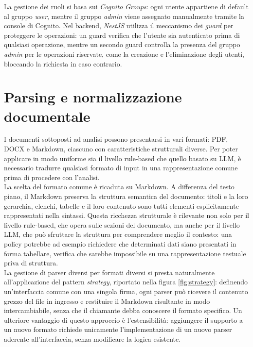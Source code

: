 La gestione dei ruoli si basa sui \emph{Cognito Groups}: ogni utente appartiene di default al gruppo \emph{user}, mentre il gruppo \emph{admin} viene assegnato manualmente tramite la console di Cognito. Nel backend, \emph{NestJS} utilizza il meccanismo dei \emph{guard} per proteggere le operazioni: un guard verifica che l'utente sia autenticato prima di qualsiasi operazione, mentre un secondo guard controlla la presenza del gruppo \emph{admin} per le operazioni riservate, come la creazione e l'eliminazione degli utenti, bloccando la richiesta in caso contrario.

\section{Parsing e normalizzazione documentale}
\label{section:parsing}
I documenti sottoposti ad analisi possono presentarsi in vari formati: PDF, DOCX e Markdown, ciascuno con caratteristiche strutturali diverse. Per poter applicare in modo uniforme sia il livello rule-based che quello basato su LLM, è necessario tradurre qualsiasi formato di input in una rappresentazione comune prima di procedere con l'analisi.\\

La scelta del formato comune è ricaduta su Markdown. A differenza del testo piano, il Markdown preserva la struttura semantica del documento: titoli e la loro gerarchia, elenchi, tabelle e il loro contenuto sono tutti elementi esplicitamente rappresentati nella sintassi. Questa ricchezza strutturale è rilevante non solo per il livello rule-based, che opera sulle sezioni del documento, ma anche per il livello LLM, che può sfruttare la struttura per comprendere meglio il contesto: una policy potrebbe ad esempio richiedere che determinati dati siano presentati in forma tabellare, verifica che sarebbe impossibile su una rappresentazione testuale priva di struttura.\\

La gestione di parser diversi per formati diversi si presta naturalmente all'applicazione del pattern {\emph{\gls{strategy}}\glsfirstoccur}, riportato nella figura \ref{fig:strategy}: definendo un'interfaccia comune con una singola firma, ogni parser può ricevere il contenuto grezzo del file in ingresso e restituire il Markdown risultante in modo intercambiabile, senza che il chiamante debba conoscere il formato specifico. Un ulteriore vantaggio di questo approccio è l'estensibilità: aggiungere il supporto a un nuovo formato richiede unicamente l'implementazione di un nuovo parser aderente all'interfaccia, senza modificare la logica esistente.\\

